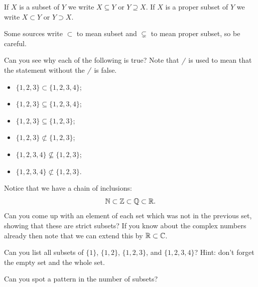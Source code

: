 \documentclass[fleqn]{LectureClass/LectureClass}
\begin{document}
    \begin{ntn}{}{}
        If \(X\) is a subset of \(Y\) we write \(X \subseteq Y\) or \(Y \supseteq X\).
        If \(X\) is a proper subset of \(Y\) we write \(X \subset Y\) or \(Y \supset X\).
        
        \begin{wrn}
            Some sources write \(\subset\) to mean subset and \(\subsetneq\) to mean proper subset, so be careful.
        \end{wrn}
    \end{ntn}
    
    \begin{exm}{}{}
        Can you see why each of the following is true?
        Note that \(\cancel{\phantom{x}}\) is used to mean that the statement without the \(\cancel{\phantom{x}}\) is false.
        \begin{itemize}
            \item \(\{1, 2, 3\} \subset \{1, 2, 3, 4\}\);
            \item \(\{1, 2, 3\} \subseteq \{1, 2, 3, 4\}\);
            \item \(\{1, 2, 3\} \subseteq \{1, 2, 3\}\);
            \item \(\{1, 2, 3\} \not\subset \{1, 2, 3\}\);
            \item \(\{1, 2, 3, 4\} \not\subseteq \{1, 2, 3\}\);
            \item \(\{1, 2, 3, 4\} \not\subset \{1, 2, 3\}\).
        \end{itemize}
    \end{exm}
    
    \begin{exm}{}{}
        Notice that we have a chain of inclusions:
        \begin{equation}
            \mathbb{N} \subset \mathbb{Z} \subset \mathbb{Q} \subset \mathbb{R}.
        \end{equation}
        Can you come up with an element of each set which was not in the previous set, showing that these are strict subsets?
        If you know about the complex numbers already then note that we can extend this by \(\mathbb{R} \subset \mathbb{C}\).
    \end{exm}
    
    \begin{problem}{}{}
        Can you list all subsets of \(\{1\}\), \(\{1, 2\}\), \(\{1, 2, 3\}\), and \(\{1, 2, 3, 4\}\)?
        Hint: don't forget the empty set and the whole set.
        
        Can you spot a pattern in the number of subsets?
    \end{problem}
    
\end{document}
